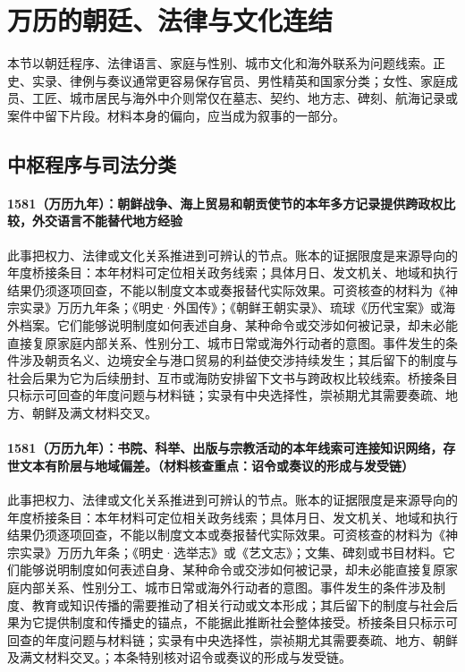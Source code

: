 \section{万历的朝廷、法律与文化连结}

本节以朝廷程序、法律语言、家庭与性别、城市文化和海外联系为问题线索。正史、实录、律例与奏议通常更容易保存官员、男性精英和国家分类；女性、家庭成员、工匠、城市居民与海外中介则常仅在墓志、契约、地方志、碑刻、航海记录或案件中留下片段。材料本身的偏向，应当成为叙事的一部分。

\subsection{中枢程序与司法分类}

\paragraph{1581（万历九年）：朝鲜战争、海上贸易和朝贡使节的本年多方记录提供跨政权比较，外交语言不能替代地方经验} 此事把权力、法律或文化关系推进到可辨认的节点。账本的证据限度是来源导向的年度桥接条目：本年材料可定位相关政务线索；具体月日、发文机关、地域和执行结果仍须逐项回查，不能以制度文本或奏报替代实际效果。可资核查的材料为《神宗实录》万历九年条；《明史·外国传》；《朝鲜王朝实录》、琉球《历代宝案》或海外档案。它们能够说明制度如何表述自身、某种命令或交涉如何被记录，却未必能直接复原家庭内部关系、性别分工、城市日常或海外行动者的意图。事件发生的条件涉及朝贡名义、边境安全与港口贸易的利益使交涉持续发生；其后留下的制度与社会后果为它为后续册封、互市或海防安排留下文书与跨政权比较线索。桥接条目只标示可回查的年度问题与材料链；实录有中央选择性，崇祯期尤其需要奏疏、地方、朝鲜及满文材料交叉。

\paragraph{1581（万历九年）：书院、科举、出版与宗教活动的本年线索可连接知识网络，存世文本有阶层与地域偏差。（材料核查重点：诏令或奏议的形成与发受链）} 此事把权力、法律或文化关系推进到可辨认的节点。账本的证据限度是来源导向的年度桥接条目：本年材料可定位相关政务线索；具体月日、发文机关、地域和执行结果仍须逐项回查，不能以制度文本或奏报替代实际效果。可资核查的材料为《神宗实录》万历九年条；《明史·选举志》或《艺文志》；文集、碑刻或书目材料。它们能够说明制度如何表述自身、某种命令或交涉如何被记录，却未必能直接复原家庭内部关系、性别分工、城市日常或海外行动者的意图。事件发生的条件涉及制度、教育或知识传播的需要推动了相关行动或文本形成；其后留下的制度与社会后果为它提供制度和传播史的锚点，不能据此推断社会整体接受。桥接条目只标示可回查的年度问题与材料链；实录有中央选择性，崇祯期尤其需要奏疏、地方、朝鲜及满文材料交叉。；本条特别核对诏令或奏议的形成与发受链。

